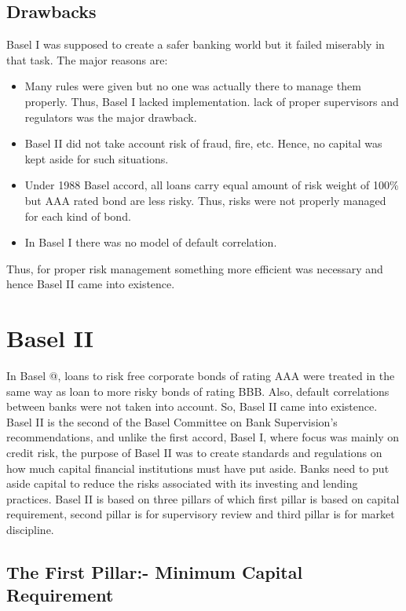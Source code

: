 \documentclass[11pt]{article}
\makeatletter
\newcommand{\Rmnum}[1]{\expandafter\@slowromancap\romannumeral #1@}
\numberwithin{equation}{section}
\makeatother
\begin{document}
\subsection{Drawbacks}
\medskip

Basel I was supposed to create a safer banking world but it failed miserably in that task. The major reasons are: 
\begin{itemize}
\item Many rules were given but no one was actually there to manage them properly. Thus, Basel I lacked implementation. lack of proper supervisors and regulators was the major drawback.

\item Basel II did not take account risk of fraud, fire, etc. Hence, no capital was kept aside for such situations. 

\item Under 1988 Basel accord, all loans carry equal amount of risk weight of 100\% but AAA rated bond are less risky. Thus, risks were not properly managed for each kind of bond.

\item In Basel I there was no model of default correlation.
\end{itemize} 
Thus, for proper risk management something more efficient was necessary and hence Basel II came into existence. 



\pagebreak
\section{Basel II}
\medskip

In Basel \Rmnum{2}, loans to risk free corporate bonds of rating AAA were treated in the same way as loan to more risky bonds of rating BBB. Also, default correlations between banks were not taken into account. So, Basel II came into existence. Basel II is the second of the Basel Committee on Bank Supervision's recommendations, and unlike the first accord, Basel I, where focus was mainly on credit risk, the purpose of Basel II was to create standards and regulations on how much capital financial institutions must have put aside. Banks need to put aside capital to reduce the risks associated with its investing and lending practices. Basel II is based on three pillars of which first pillar is based on capital requirement, second pillar is for supervisory review and third pillar is for market discipline.

\subsection{The First Pillar:- Minimum Capital Requirement}
\medskip
\end{document}

